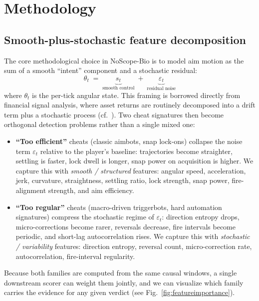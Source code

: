 \documentclass[conference,10pt]{IEEEtran}
\begin{document}
\section{Methodology}
\label{sec:method}

\subsection{Smooth-plus-stochastic feature decomposition}
\label{sec:decomp}

The core methodological choice in NoScope-Bio is to model aim motion as
the sum of a smooth ``intent'' component and a stochastic residual:
\begin{equation}
\theta_t \;=\; \underbrace{s_t}_{\text{smooth control}}
\;+\; \underbrace{\varepsilon_t}_{\text{residual noise}}
\label{eq:decomp}
\end{equation}
where $\theta_t$ is the per-tick angular state. This framing is borrowed
directly from financial signal analysis, where asset returns are routinely
decomposed into a drift term plus a stochastic process
(cf.~\cite{black1973pricing,mandelbrot1968fractional}). Two cheat
signatures then become orthogonal detection problems rather than a
single mixed one:
\begin{itemize}
  \item \textbf{``Too efficient''} cheats (classic aimbots, snap lock-ons)
    collapse the noise term $\varepsilon_t$ relative to the player's
    baseline: trajectories become straighter, settling is faster, lock
    dwell is longer, snap power on acquisition is higher. We capture
    this with \emph{smooth / structured} features:
    angular speed, acceleration, jerk, curvature, straightness,
    settling ratio, lock strength, snap power, fire-alignment strength,
    and aim efficiency.
  \item \textbf{``Too regular''} cheats (macro-driven triggerbots, hard
    automation signatures) compress the stochastic regime of
    $\varepsilon_t$: direction entropy drops, micro-corrections become
    rarer, reversals decrease, fire intervals become periodic, and
    short-lag autocorrelation rises. We capture this with \emph{stochastic
    / variability} features: direction entropy, reversal count,
    micro-correction rate, autocorrelation, fire-interval regularity.
\end{itemize}
Because both families are computed from the same causal windows, a single
downstream scorer can weight them jointly, and we can visualize which
family carries the evidence for any given verdict (see
Fig.~\ref{fig:featureimportance}).
\end{document}
